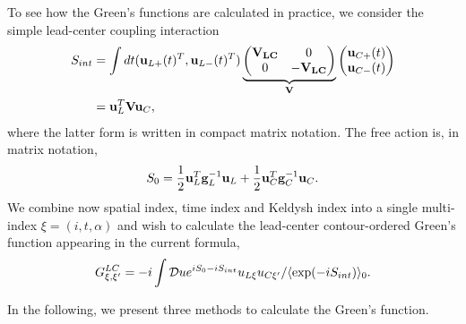 To see how the Green's functions are calculated in practice, we consider the simple lead-center coupling interaction 
\begin{alignat}{2}
 S_{int} &= \int dt (\mathbf{u}_{L+}(t)^T,\mathbf{u}_{L-}(t)^T) \underbrace{\left(\begin{matrix}
      \mathbf{V_{LC}} & 0 \\
      0 & - \mathbf{V_{LC}} \\
     \end{matrix}\right) }_{\mathbf{V}}
    \left(\begin{matrix} \mathbf{u}_{C+}(t) \\ \mathbf{u}_{C-}(t) \end{matrix} \right) \\
  &= \mathbf{u}_L^T \mathbf{V} \mathbf{u}_C,
\end{alignat}
where the latter form is written in compact matrix notation. The free action is, in matrix notation,
\begin{alignat}{2}
 S_0 = \frac{1}{2} \mathbf{u}_{L}^T \mathbf{g}^{-1}_{L} \mathbf{u}_{L} +  \frac{1}{2} \mathbf{u}_{C}^T \mathbf{g}^{-1}_{C} \mathbf{u}_{C}.
\end{alignat}
We combine now spatial index, time index and Keldysh index into a single multi-index $\xi=(i,t,\alpha)$ and wish to calculate the lead-center contour-ordered Green's function appearing in the current formula,
\begin{alignat}{2}
 G_{\xi,\xi'}^{LC} = -i \int \mathcal{D}u e^{iS_0-iS_{int}} u_{L\xi}u_{C\xi'}/\langle \exp(-iS_{int})\rangle_0.
\end{alignat}

In the following, we present three methods to calculate the Green's function. 

